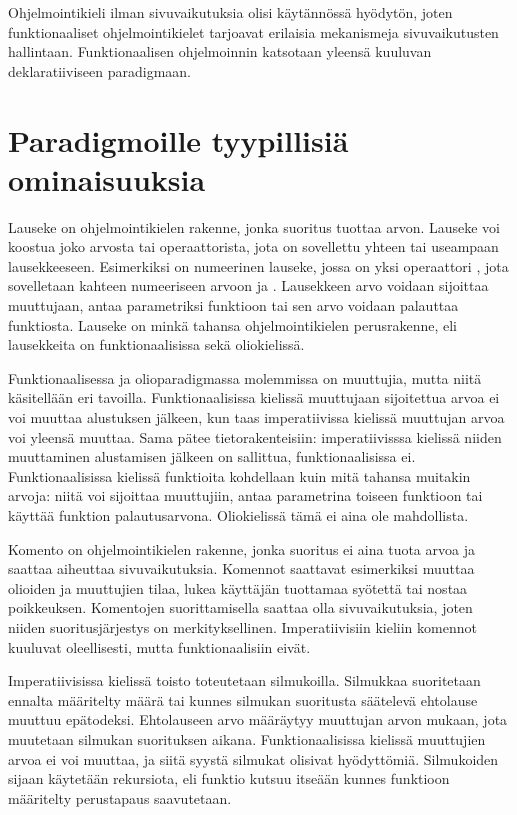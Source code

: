 Ohjelmointikieli ilman sivuvaikutuksia olisi käytännössä hyödytön, joten funktionaaliset ohjelmointikielet tarjoavat erilaisia mekanismeja sivuvaikutusten hallintaan.  Funktionaalisen ohjelmoinnin katsotaan yleensä kuuluvan deklaratiiviseen paradigmaan. \cite[Luku 11]{principlesAndParadigms}


\section{Paradigmoille tyypillisiä ominaisuuksia}
Lauseke on ohjelmointikielen rakenne, jonka suoritus tuottaa arvon. Lauseke voi koostua joko arvosta tai operaattorista, jota on sovellettu yhteen tai useampaan lausekkeeseen. Esimerkiksi  on numeerinen lauseke, jossa on yksi operaattori \code{+}, jota sovelletaan kahteen numeeriseen arvoon  ja . Lausekkeen arvo voidaan sijoittaa muuttujaan, antaa parametriksi funktioon tai sen arvo voidaan palauttaa funktiosta. Lauseke on minkä tahansa ohjelmointikielen perusrakenne, eli lausekkeita on funktionaalisissa sekä oliokielissä.
\cite[Luku 6]{principlesAndParadigms}

Funktionaalisessa ja olioparadigmassa molemmissa on muuttujia, mutta niitä käsitellään eri tavoilla. Funktionaalisissa kielissä muuttujaan sijoitettua arvoa ei voi muuttaa alustuksen jälkeen, kun taas imperatiivissa kielissä muuttujan arvoa voi yleensä muuttaa. Sama pätee tietorakenteisiin: imperatiivisssa kielissä niiden muuttaminen alustamisen jälkeen on sallittua, funktionaalisissa ei. \cite[Luku 3]{functionalProgrammingInScala} Funktionaalisissa kielissä funktioita kohdellaan kuin mitä tahansa muitakin arvoja: niitä voi sijoittaa muuttujiin, antaa parametrina toiseen funktioon tai käyttää funktion palautusarvona. Oliokielissä tämä ei aina ole mahdollista.
\cite[Luku 6]{principlesAndParadigms}

Komento on ohjelmointikielen rakenne, jonka suoritus ei aina tuota arvoa ja saattaa aiheuttaa sivuvaikutuksia. Komennot saattavat esimerkiksi muuttaa olioiden ja muuttujien tilaa, lukea käyttäjän tuottamaa syötettä tai nostaa poikkeuksen. Komentojen suorittamisella saattaa olla sivuvaikutuksia, joten niiden suoritusjärjestys on merkityksellinen. Imperatiivisiin kieliin komennot kuuluvat oleellisesti, mutta funktionaalisiin eivät.

Imperatiivisissa kielissä toisto toteutetaan silmukoilla. Silmukkaa suoritetaan ennalta määritelty määrä tai kunnes silmukan suoritusta säätelevä ehtolause muuttuu epätodeksi. Ehtolauseen arvo määräytyy muuttujan arvon mukaan, jota muutetaan silmukan suorituksen aikana. Funktionaalisissa kielissä muuttujien arvoa ei voi muuttaa, ja siitä syystä silmukat olisivat hyödyttömiä. Silmukoiden sijaan käytetään rekursiota, eli funktio kutsuu itseään kunnes funktioon määritelty perustapaus saavutetaan.
\cite[Luku 6 ja 11]{principlesAndParadigms}

